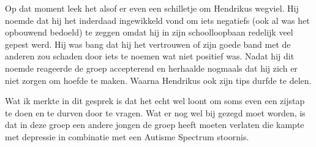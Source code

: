 Op dat moment leek het alsof er even een schilletje om Hendrikus wegviel. Hij noemde dat hij het inderdaad ingewikkeld vond om iets negatiefs (ook al was het opbouwend bedoeld) te zeggen omdat hij in zijn schoolloopbaan redelijk veel gepest werd. Hij was bang dat hij het vertrouwen of zijn goede band met de anderen zou schaden door iets te noemen wat niet positief was. Nadat hij dit noemde reageerde de groep accepterend en herhaalde nogmaals dat hij zich er niet zorgen om hoefde te maken. Waarna Hendrikus ook zijn tips durfde te delen.

Wat ik merkte in dit gesprek is dat het echt wel loont om soms even een zijstap te doen en te durven door te vragen. Wat er nog wel bij gezegd moet worden, is dat in deze groep een andere jongen de groep heeft moeten verlaten die kampte met depressie in combinatie met een Autisme Spectrum stoornis.